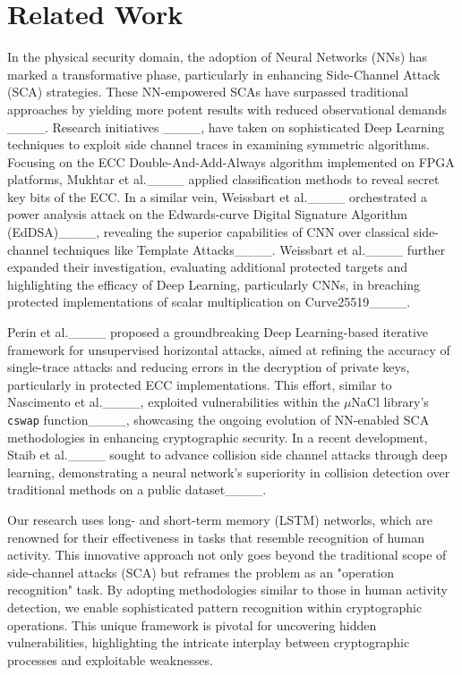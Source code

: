 \section{Related Work}
In the physical security domain, the adoption of Neural Networks (NNs) has marked a transformative phase, particularly in enhancing Side-Channel Attack (SCA) strategies. These NN-empowered SCAs have surpassed traditional approaches by yielding more potent results with reduced observational demands ____. Research initiatives ____, have taken on sophisticated Deep Learning techniques to exploit side channel traces in examining symmetric algorithms. Focusing on the ECC Double-And-Add-Always algorithm implemented on FPGA platforms, Mukhtar et al.____ applied classification methods to reveal secret key bits of the ECC. In a similar vein, Weissbart et al.____ orchestrated a power analysis attack on the Edwards-curve Digital Signature Algorithm (EdDSA)____, revealing the superior capabilities of CNN over classical side-channel techniques like Template Attacks____. Weissbart et al.____ further expanded their investigation, evaluating additional protected targets and highlighting the efficacy of Deep Learning, particularly CNNs, in breaching protected implementations of scalar multiplication on Curve25519____.

Perin et al.____ proposed a groundbreaking Deep Learning-based iterative framework for unsupervised horizontal attacks, aimed at refining the accuracy of single-trace attacks and reducing errors in the decryption of private keys, particularly in protected ECC implementations. This effort, similar to Nascimento et al.____, exploited vulnerabilities within the $\mu$NaCl library's \texttt{cswap} function____, showcasing the ongoing evolution of NN-enabled SCA methodologies in enhancing cryptographic security. In a recent development, Staib et al.____ sought to advance collision side channel attacks through deep learning, demonstrating a neural network's superiority in collision detection over traditional methods on a public dataset____. 

Our research uses long- and short-term memory (LSTM) networks, which are renowned for their effectiveness in tasks that resemble recognition of human activity. This innovative approach not only goes beyond the traditional scope of side-channel attacks (SCA) but reframes the problem as an "operation recognition" task. By adopting methodologies similar to those in human activity detection, we enable sophisticated pattern recognition within cryptographic operations. This unique framework is pivotal for uncovering hidden vulnerabilities, highlighting the intricate interplay between cryptographic processes and exploitable weaknesses.